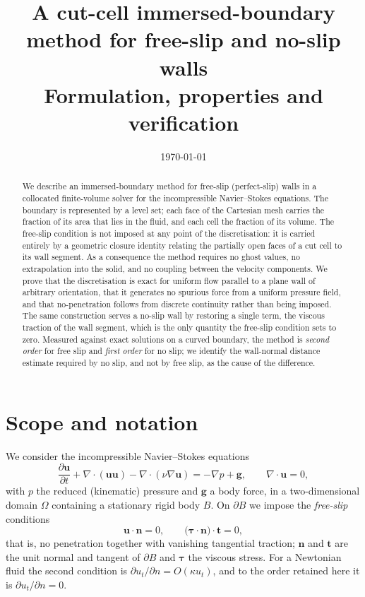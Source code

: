 \documentclass[11pt,a4paper]{article}
\title{\bf A cut-cell immersed-boundary method for free-slip and no-slip walls\\
\large Formulation, properties and verification}
\author{}
\date{\today}
\theoremstyle{remark}
\newcommand{\uu}{\bm{u}}
\newcommand{\nn}{\bm{n}}
\newcommand{\ttt}{\bm{t}}
\begin{document}
\maketitle

\begin{abstract}
We describe an immersed-boundary method for free-slip (perfect-slip) walls in a
collocated finite-volume solver for the incompressible Navier--Stokes equations. The
boundary is represented by a level set; each face of the Cartesian mesh carries the
fraction of its area that lies in the fluid, and each cell the fraction of its volume. The
free-slip condition is not imposed at any point of the discretisation: it is carried
entirely by a geometric closure identity relating the partially open faces of a cut cell to
its wall segment. As a consequence the method requires no ghost values, no extrapolation
into the solid, and no coupling between the velocity components. We prove that the
discretisation is exact for uniform flow parallel to a plane wall of arbitrary orientation,
that it generates no spurious force from a uniform pressure field, and that no-penetration
follows from discrete continuity rather than being imposed. The same construction serves a
no-slip wall by restoring a single term, the viscous traction of the wall segment, which is
the only quantity the free-slip condition sets to zero. Measured against exact solutions on a
curved boundary, the method is \emph{second order} for free slip and \emph{first order} for
no slip; we identify the wall-normal distance estimate required by no slip, and not by free
slip, as the cause of the difference.
\end{abstract}

\tableofcontents

\section{Scope and notation}

We consider the incompressible Navier--Stokes equations
\begin{equation}
\frac{\partial \uu}{\partial t}+\nabla\!\cdot\!(\uu\uu)-\nabla\!\cdot\!(\nu\nabla\uu)
=-\nabla p+\bm{g},
\qquad \nabla\!\cdot\!\uu=0,
\label{eq:ns}
\end{equation}
with $p$ the reduced (kinematic) pressure and $\bm{g}$ a body force, in a two-dimensional
domain $\Omega$ containing a stationary rigid body $B$. On $\partial B$ we impose the
\emph{free-slip} conditions
\begin{equation}
\uu\cdot\nn = 0,
\qquad
\big(\bm{\tau}\cdot\nn\big)\cdot\ttt = 0,
\label{eq:bc}
\end{equation}
that is, no penetration together with vanishing tangential traction; $\nn$ and $\ttt$ are the
unit normal and tangent of $\partial B$ and $\bm{\tau}$ the viscous stress. For a Newtonian
fluid the second condition is $\partial u_t/\partial n = O(\kappa u_t)$, and to the order
retained here it is $\partial u_t/\partial n = 0$.
\end{document}
